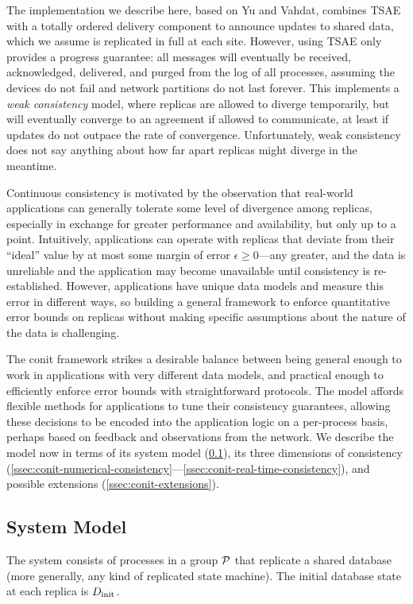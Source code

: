 \documentclass[]             %
{NASA}                       %
\theoremstyle{definition}
\begin{document}
The implementation we describe here, based on Yu and Vahdat, combines
TSAE with a totally ordered delivery component to announce updates to
shared data, which we assume is replicated in full at each
site. However, using TSAE only provides a progress guarantee: all
messages will eventually be received, acknowledged, delivered, and
purged from the log of all processes, assuming the devices do not fail
and network partitions do not last forever. This implements a
\emph{weak consistency} model, where replicas are allowed to diverge
temporarily, but will eventually converge to an agreement if allowed
to communicate, at least if updates do not outpace the rate of
convergence. Unfortunately, weak consistency does not say anything
about how far apart replicas might diverge in the meantime.

Continuous consistency is motivated by the observation that real-world
applications can generally tolerate some level of divergence among
replicas, especially in exchange for greater performance and
availability, but only up to a point. Intuitively, applications can
operate with replicas that deviate from their ``ideal'' value by at
most some margin of error $\epsilon \geq 0$---any greater, and the
data is unreliable and the application may become unavailable until
consistency is re-established. However, applications have unique data
models and measure this error in different ways, so building a general
framework to enforce quantitative error bounds on replicas without
making specific assumptions about the nature of the data is
challenging.

The conit framework strikes a desirable balance between being general
enough to work in applications with very different data models, and
practical enough to efficiently enforce error bounds with
straightforward protocols. The model affords flexible methods for
applications to tune their consistency guarantees, allowing these
decisions to be encoded into the application logic on a per-process
basis, perhaps based on feedback and observations from the network. We
describe the model now in terms of its system model
(\ref{ssec:conit-system-model}), its three dimensions of consistency
(\ref{ssec:conit-numerical-consistency}---\ref{ssec:conit-real-time-consistency}),
and possible extensions (\ref{ssec:conit-extensions}).

\subsection{System Model}
\label{ssec:conit-system-model}
The system consists of processes in a group $\mathcal{P}$ that replicate
a shared database (more generally, any kind of replicated state
machine). The initial database state at each replica is $D_\textrm{init}$.
\end{document}
